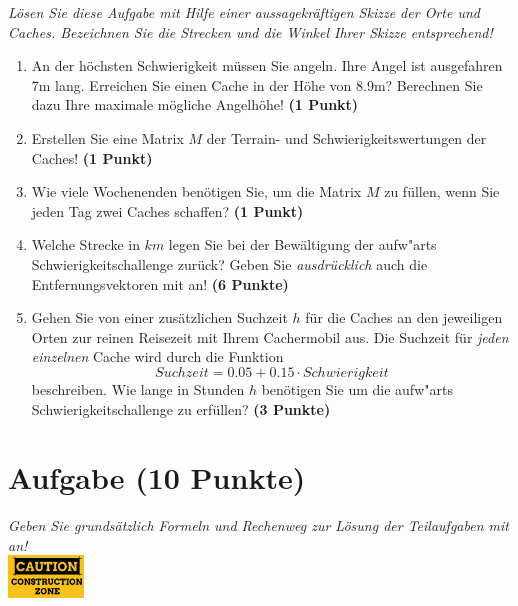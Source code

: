 \documentclass[a4paper, 10pt]{scrartcl}\usepackage[]{graphicx}\usepackage[]{xcolor}
\begin{document}
\textit{L{\"o}sen Sie diese Aufgabe mit Hilfe einer aussagekr{\"a}ftigen Skizze der
  Orte und Caches. Bezeichnen Sie die Strecken und die Winkel Ihrer Skizze
  entsprechend!}

\begin{enumerate}
\item An der h{\"o}chsten Schwierigkeit m{\"u}ssen Sie angeln. Ihre Angel ist
  ausgefahren 7m lang. Erreichen Sie einen Cache in der H{\"o}he
  von 8.9m?  Berechnen Sie dazu Ihre maximale m{\"o}gliche
  Angelh{\"o}he! \textbf{(1 Punkt)}
\item Erstellen Sie eine Matrix $M$ der Terrain- und Schwierigkeitswertungen
  der Caches! \textbf{(1 Punkt)}  
\item Wie viele Wochenenden ben{\"o}tigen Sie, um die Matrix $M$ zu f{\"u}llen, wenn Sie
  jeden Tag zwei Caches schaffen? \textbf{(1 Punkt)} 
\item Welche Strecke in $km$ legen Sie bei der Bew{\"a}ltigung der
  aufw{"a}rts Schwierigkeitschallenge zur{\"u}ck? Geben Sie
  \textit{ausdr{\"u}cklich} auch die Entfernungsvektoren mit an! \textbf{(6
    Punkte)}
\item Gehen Sie von einer zus{\"a}tzlichen Suchzeit $h$ f{\"u}r die Caches an den
  jeweiligen Orten zur reinen Reisezeit mit Ihrem Cachermobil aus. Die
  Suchzeit f{\"u}r \textit{jeden einzelnen} Cache wird durch die Funktion
  \begin{equation*}
    Suchzeit = 0.05 + 0.15 \cdot Schwierigkeit
  \end{equation*}  
  beschreiben.  Wie lange in Stunden $h$ ben{\"o}tigen Sie um die
  aufw{"a}rts Schwierigkeitschallenge zu erf{\"u}llen? \textbf{(3 Punkte)} 
\end{enumerate}


\clearpage\null
\clearpage\null 
\clearpage

\section{Aufgabe \hfill (10 Punkte)}

\textit{Geben Sie grunds{\"a}tzlich Formeln und Rechenweg zur L{\"o}sung der
  Teilaufgaben mit an!} \\[1Ex]

\hfill\href{foo}{\includegraphics[width =
  2cm]{img/caution}} %
\hspace{2Ex}
\end{document}
